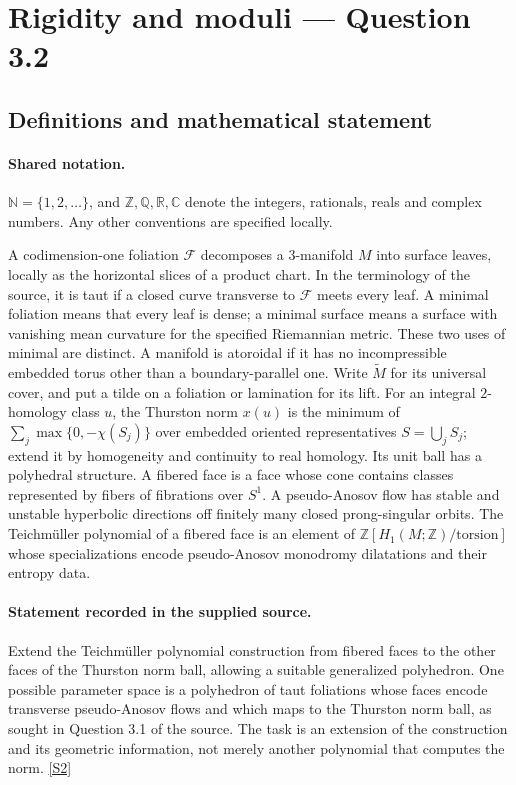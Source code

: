 \documentclass[11pt]{article}
\newcommand{\sref}[2]{\hyperlink{source:#1:#2}{[S#2]}}
\begin{document}
\section{Rigidity and moduli — Question 3.2}\label{statement}

\subsection{Definitions and mathematical statement}

\paragraph{Shared notation.}$\mathbb N=\{1,2,\ldots\}$, and $\mathbb Z,\mathbb Q,\mathbb R,\mathbb C$ denote the integers, rationals, reals and complex numbers. Any other conventions are specified locally.


A codimension-one foliation $\mathcal F$ decomposes a $3$-manifold $M$ into surface leaves, locally as the horizontal slices of a product chart. In the terminology of the source, it is taut if a closed curve transverse to $\mathcal F$ meets every leaf. A minimal foliation means that every leaf is dense; a minimal surface means a surface with vanishing mean curvature for the specified Riemannian metric. These two uses of minimal are distinct. A manifold is atoroidal if it has no incompressible embedded torus other than a boundary-parallel one. Write $\widetilde M$ for its universal cover, and put a tilde on a foliation or lamination for its lift. For an integral $2$-homology class $u$, the Thurston norm $x(u)$ is the minimum of $\sum_j\max\{0,-\chi(S_j)\}$ over embedded oriented representatives $S=\bigcup_j S_j$; extend it by homogeneity and continuity to real homology. Its unit ball has a polyhedral structure. A fibered face is a face whose cone contains classes represented by fibers of fibrations over $S^1$. A pseudo-Anosov flow has stable and unstable hyperbolic directions off finitely many closed prong-singular orbits. The Teichm\"uller polynomial of a fibered face is an element of $\mathbb Z[H_1(M;\mathbb Z)/\mathrm{torsion}]$ whose specializations encode pseudo-Anosov monodromy dilatations and their entropy data.
\paragraph{Statement recorded in the supplied source.}
Extend the Teichm\"uller polynomial construction from fibered faces to the other faces of the Thurston norm ball, allowing a suitable generalized polyhedron. One possible parameter space is a polyhedron of taut foliations whose faces encode transverse pseudo-Anosov flows and which maps to the Thurston norm ball, as sought in Question 3.1 of the source. The task is an extension of the construction and its geometric information, not merely another polynomial that computes the norm. \sref{statement}{2}
\end{document}
